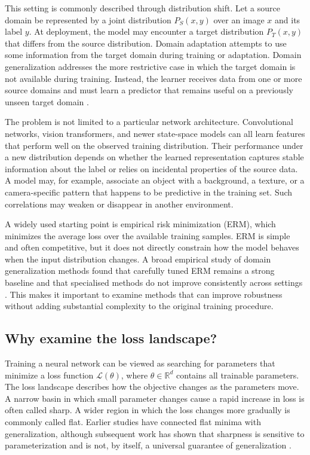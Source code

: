 \documentclass[11pt,a4paper]{article}
\newcommand{\R}{\mathbb{R}}
\begin{document}
This setting is commonly described through distribution shift. Let a source domain be represented by a joint distribution $P_S(x,y)$ over an image $x$ and its label $y$. At deployment, the model may encounter a target distribution $P_T(x,y)$ that differs from the source distribution. Domain adaptation attempts to use some information from the target domain during training or adaptation. Domain generalization addresses the more restrictive case in which the target domain is not available during training. Instead, the learner receives data from one or more source domains and must learn a predictor that remains useful on a previously unseen target domain \cite{quinonero2009dataset,bendavid2010theory,blanchard2011generalizing,muandet2013domain}.

The problem is not limited to a particular network architecture. Convolutional networks, vision transformers, and newer state-space models can all learn features that perform well on the observed training distribution. Their performance under a new distribution depends on whether the learned representation captures stable information about the label or relies on incidental properties of the source data. A model may, for example, associate an object with a background, a texture, or a camera-specific pattern that happens to be predictive in the training set. Such correlations may weaken or disappear in another environment.

A widely used starting point is empirical risk minimization (ERM), which minimizes the average loss over the available training samples. ERM is simple and often competitive, but it does not directly constrain how the model behaves when the input distribution changes. A broad empirical study of domain generalization methods found that carefully tuned ERM remains a strong baseline and that specialised methods do not improve consistently across settings \cite{gulrajani2021search}. This makes it important to examine methods that can improve robustness without adding substantial complexity to the original training procedure.

\subsection{Why examine the loss landscape?}
Training a neural network can be viewed as searching for parameters that minimize a loss function $\mathcal{L}(\theta)$, where $\theta\in\R^d$ contains all trainable parameters. The loss landscape describes how the objective changes as the parameters move. A narrow basin in which small parameter changes cause a rapid increase in loss is often called sharp. A wider region in which the loss changes more gradually is commonly called flat. Earlier studies have connected flat minima with generalization, although subsequent work has shown that sharpness is sensitive to parameterization and is not, by itself, a universal guarantee of generalization \cite{hochreiter1997flat,keskar2017large,dinh2017sharp,jiang2020fantastic}.
\end{document}
